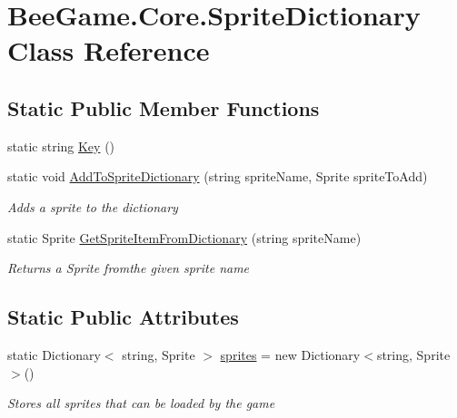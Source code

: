 \hypertarget{class_bee_game_1_1_core_1_1_sprite_dictionary}{}\section{Bee\+Game.\+Core.\+Sprite\+Dictionary Class Reference}
\label{class_bee_game_1_1_core_1_1_sprite_dictionary}
\subsection*{Static Public Member Functions}
\begin{DoxyCompactItemize}
\item 
static string \hyperlink{class_bee_game_1_1_core_1_1_sprite_dictionary_ae4d45a1450cc2a99493ca8aee6ebaab6}{Key} ()
\item 
static void \hyperlink{class_bee_game_1_1_core_1_1_sprite_dictionary_a55f237ff9c91a35b88adab2a4be844ed}{Add\+To\+Sprite\+Dictionary} (string sprite\+Name, Sprite sprite\+To\+Add)
\begin{DoxyCompactList}\small\item\em Adds a sprite to the dictionary \end{DoxyCompactList}\item 
static Sprite \hyperlink{class_bee_game_1_1_core_1_1_sprite_dictionary_a17fca1828cb89197a540e2e7ab0c43cd}{Get\+Sprite\+Item\+From\+Dictionary} (string sprite\+Name)
\begin{DoxyCompactList}\small\item\em Returns a Sprite fromthe given sprite name \end{DoxyCompactList}\end{DoxyCompactItemize}
\subsection*{Static Public Attributes}
\begin{DoxyCompactItemize}
\item 
static Dictionary$<$ string, Sprite $>$ \hyperlink{class_bee_game_1_1_core_1_1_sprite_dictionary_a40c5e9e2f9f25548971faadbbbde4529}{sprites} = new Dictionary$<$string, Sprite$>$()
\begin{DoxyCompactList}\small\item\em Stores all sprites that can be loaded by the game \end{DoxyCompactList}\end{DoxyCompactItemize}


